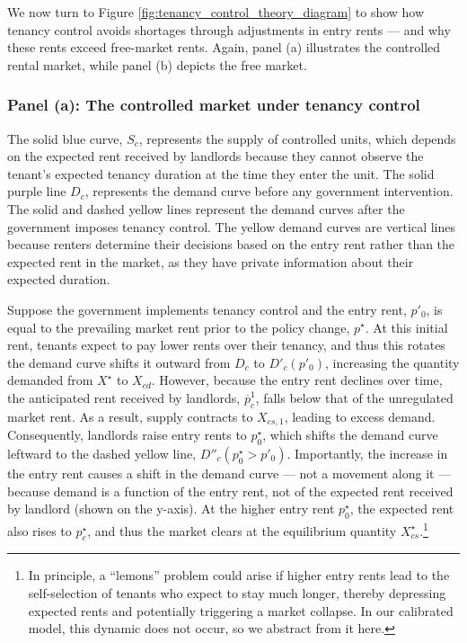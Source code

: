 \documentclass[parskip=full]{article}
\begin{document}
We now turn to Figure \ref{fig:tenancy_control_theory_diagram} to show how tenancy control avoids shortages through adjustments in entry rents — and why these rents exceed free-market rents. Again, panel (a) illustrates the controlled rental market, while panel (b) depicts the free market.

\subsubsection{Panel (a): The controlled market under tenancy control}
The solid blue curve, $S_c$, represents the supply of controlled units, which depends on the expected rent received by landlords because they cannot observe the tenant's expected tenancy duration at the time they enter the unit. The solid purple line $D_{c}$, represents the demand curve before any government intervention. The solid and dashed yellow lines represent the demand curves after the government imposes tenancy control. The yellow demand curves are vertical lines because renters determine their decisions based on the entry rent rather than the expected rent in the market, as they have private information about their expected duration.

Suppose the government implements tenancy control and the entry rent, $p'_0$, is equal to the prevailing market rent prior to the policy change, $p^{\star}$. At this initial rent, tenants expect to pay lower rents over their tenancy, and thus this rotates the demand curve shifts it outward from $D_c$ to $D'_c(p'_0)$, increasing the quantity demanded from $X^{\star}$ to $X_{cd}$. However, because the entry rent declines over time, the anticipated rent received by landlords, $\overline{p}^1_c$, falls below that of the unregulated market rent. As a result, supply contracts to $X_{cs,1}$, leading to excess demand. Consequently, landlords raise entry rents to $p^{\star}_0$, which shifts the demand curve leftward to the dashed yellow line, $D''_c(p^{\star}_0 > p'_0)$. Importantly, the increase in the entry rent causes a shift in the demand curve — not a movement along it — because demand is a function of the entry rent, not of the expected rent received by landlord (shown on the y-axis). At the higher entry rent $p^{\star}_0$, the expected rent also rises to $p^{\star}_c$, and thus the market clears at the equilibrium quantity $X^{\star}_{cs}$.\footnote{In principle, a “lemons” problem could arise if higher entry rents lead to the self-selection of tenants who expect to stay much longer, thereby depressing expected rents and potentially triggering a market collapse. In our calibrated model, this dynamic does not occur, so we abstract from it here.} 
\end{document}
